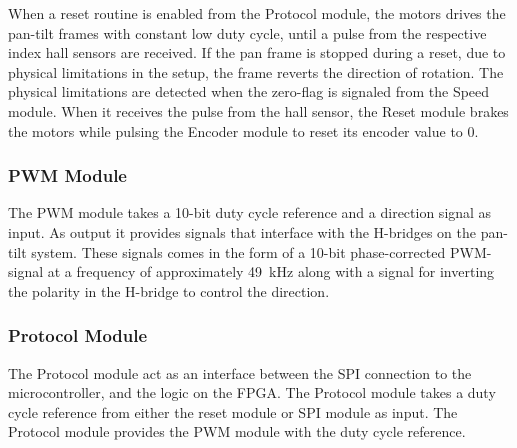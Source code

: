 \documentclass[../../main.tex]{subfiles}
\begin{document}
When a reset routine is enabled from the Protocol module, the motors drives the pan-tilt frames with constant low duty cycle, until a pulse from the respective index hall sensors are received. If the pan frame is stopped during a reset, due to physical limitations in the setup, the frame reverts the direction of rotation. The physical limitations are detected when the zero-flag is signaled from the Speed module. When it receives the pulse from the hall sensor, the Reset module brakes the motors while pulsing the Encoder module to reset its encoder value to 0. 




\subsubsection*{PWM Module}
The PWM module takes a 10-bit duty cycle reference and a direction signal as input. As output it provides signals that interface with the H-bridges on the pan-tilt system. These signals comes in the form of a 10-bit phase-corrected PWM-signal at a frequency of approximately \SI{49}{\kilo \hertz} along with a signal for inverting the polarity in the H-bridge to control the direction. 

\subsubsection*{Protocol Module}
The Protocol module act as an interface between the SPI connection to the microcontroller, and the logic on the FPGA. The Protocol module takes a duty cycle reference from either the reset module or SPI module as input. The Protocol module provides the PWM module with the duty cycle reference.
\end{document}
